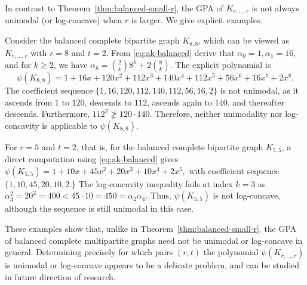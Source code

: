 \documentclass[12pt,twoside]{article}
\begin{document}
	 In contrast to Theorem~\ref{thm:balanced-small-r}, the GPA of \(K_{r,\dots,r}\) is not always unimodal (or log-concave) when \(r\) is larger. We give explicit examples.
	
	Consider the balanced complete bipartite graph \(K_{8,8}\), which can be viewed as \(K_{r,\dots,r}\) with \(r=8\) and \(t=2\). From \eqref{eq:ak-balanced} derive that $\alpha_0=1, \alpha_1=16,$ and for \(k\ge 2\), we have $\alpha_k = \binom{2}{k}8^k +2\binom{8}{k}.$ The explicit polynomial is 
		\[
		\psi(K_{8,8})
		= 1 + 16x + 120x^2 + 112x^3 + 140x^4 + 112x^5 + 56x^6 + 16x^7 + 2x^8.
		\]
		The coefficient sequence $\{1, 16, 120, 112, 140, 112, 56, 16, 2\}$ is not unimodal, as it ascends from $1$ to $120$, descends to $112$, ascends again to $140$, and thereafter descends. Furthermore, \(112^{2} \ngeq 120 \cdot 140\). Therefore, neither unimodality nor log-concavity is applicable to \(\psi(K_{8,8})\).

	For \(r=5\) and \(t=2\), that is, for the balanced complete bipartite graph \(K_{5,5}\), a direct computation using \eqref{eq:ak-balanced} gives $\psi(K_{5,5}) = 1 + 10x + 45x^2 + 20x^3 + 10x^4 + 2x^5,$	with coefficient sequence $\{1, 10, 45, 20, 10, 2.\}$ The log-concavity inequality fails at index \(k=3\) as $\alpha_3^2 = 20^2 = 400 < 45\cdot 10 = 450 = \alpha_2 \alpha_4.$ Thus, \(\psi(K_{5,5})\) is not log-concave, although the sequence is still unimodal in this case.
	
	These examples show that, unlike in Theorem~\ref{thm:balanced-small-r}, the GPA of balanced complete multipartite graphs need not be unimodal or log-concave in general. Determining precisely for which pairs \((r,t)\) the polynomial \(\psi(K_{r,\dots,r})\) is unimodal or log-concave appears to be a delicate problem, and can be studied in future direction of research.
	
	
\end{document}
